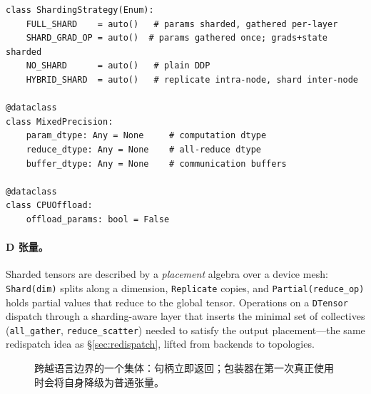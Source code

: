 \begin{lstlisting}[caption={The strategy and policy vocabulary of FSDP: everything the sharding engine needs is one enum plus three small dataclasses.}, label=lst:fsdpvocab]
class ShardingStrategy(Enum):
    FULL_SHARD    = auto()   # params sharded, gathered per-layer
    SHARD_GRAD_OP = auto()  # params gathered once; grads+state sharded
    NO_SHARD      = auto()   # plain DDP
    HYBRID_SHARD  = auto()   # replicate intra-node, shard inter-node

@dataclass
class MixedPrecision:
    param_dtype: Any = None     # computation dtype
    reduce_dtype: Any = None    # all-reduce dtype
    buffer_dtype: Any = None    # communication buffers

@dataclass
class CPUOffload:
    offload_params: bool = False
\end{lstlisting}

\paragraph{D 张量。} Sharded tensors are described by a \emph{placement} algebra over a device mesh: \texttt{Shard(dim)} splits along a dimension, \texttt{Replicate} copies, and \texttt{Partial(reduce\_op)} holds partial values that reduce to the global tensor. Operations on a \texttt{DTensor} dispatch through a sharding-aware layer that inserts the minimal set of collectives (\texttt{all\_gather}, \texttt{reduce\_scatter}) needed to satisfy the output placement---the same redispatch idea as \S\ref{sec:redispatch}, lifted from backends to topologies.


\begin{figure}[H]
\centering
{}
\caption{跨越语言边界的一个集体：句柄立即返回；包装器在第一次真正使用时会将自身降级为普通张量。}
\label{fig:collbridge}
\end{figure}

